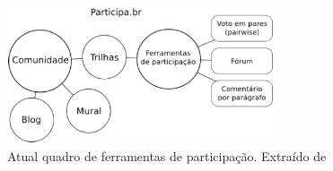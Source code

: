 \graphicspath{{figuras/}}
\begin{figure}[H]
	\centering
	\includegraphics[width=0.7\textwidth]{arquitetura-ferramentas-participa}
	\caption[Atual quadro de ferramentas de participação.]{Atual quadro de ferramentas de participação. Extraído de \cite{solagna2014metodologias}}
	\label{fig:arquiteturaparticipa}
\end{figure}

















